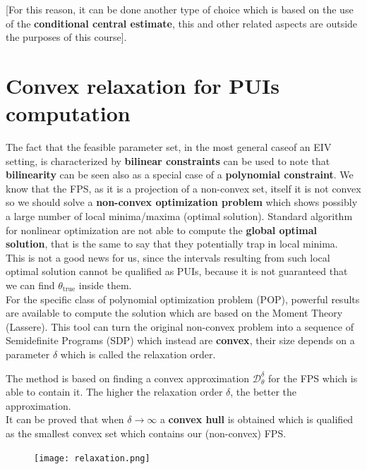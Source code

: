 \noindent
\textsf{[For this reason, it can be done another type of choice which is based on the use of the \textbf{conditional central estimate}, this and other related aspects are outside the purposes of this course].} 

\section{Convex relaxation for PUIs computation}
The fact that the feasible parameter set, in the most general caseof an EIV setting, is characterized by \textbf{bilinear constraints} can be used to note that \textbf{bilinearity} can be seen also as a special case of a \textbf{polynomial constraint}. We know that the FPS, as it is a projection of a non-convex set, itself it is not convex so we should solve a \textbf{non-convex optimization problem} which shows possibly a large number of local minima/maxima (optimal solution). Standard algorithm for nonlinear optimization are not able to compute the \textbf{global optimal solution}, that is the same to say that they potentially trap in local minima. \\
This is not a good news for us, since the intervals resulting from such local optimal solution cannot be qualified as PUIs, because it is not guaranteed that we can find $\theta_{\text{true}}$ inside them.\\

For the specific class of polynomial optimization problem (POP), powerful results are available to compute the solution which are based on the \textsf{Moment Theory} (Lassere). This tool can turn the original non-convex problem into a sequence of Semidefinite Programs (SDP) which instead are \textbf{convex}, their size depends on a parameter $\delta$ which is called the relaxation order.

The method is based on finding a convex approximation $\mathcal{D}^\delta_\theta$ for the FPS which is able to contain it. The higher the relaxation order $\delta$, the better the approximation. \\
It can be proved that when $\delta\to\infty$ a \textbf{convex hull} is obtained which is qualified as the smallest convex set which contains our (non-convex) FPS.

\begin{figure}[h]
    \centering
    \texttt{[image: relaxation.png]}
\end{figure}


